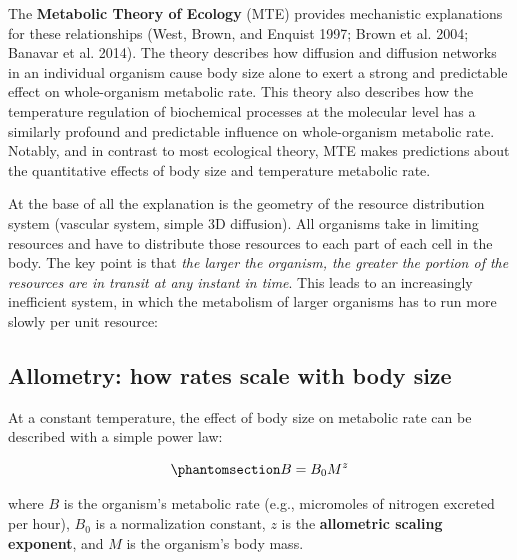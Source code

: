 \documentclass[
  letterpaper,
  DIV=11,
  numbers=noendperiod]{scrreprt}
\begin{document}
The \textbf{Metabolic Theory of Ecology} (MTE) provides mechanistic
explanations for these relationships (West, Brown, and Enquist 1997;
Brown et al. 2004; Banavar et al. 2014). The theory describes how
diffusion and diffusion networks in an individual organism cause body
size alone to exert a strong and predictable effect on whole-organism
metabolic rate. This theory also describes how the temperature
regulation of biochemical processes at the molecular level has a
similarly profound and predictable influence on whole-organism metabolic
rate. Notably, and in contrast to most ecological theory, MTE makes
predictions about the quantitative effects of body size and temperature
metabolic rate.

At the base of all the explanation is the geometry of the resource
distribution system (vascular system, simple 3D diffusion). All
organisms take in limiting resources and have to distribute those
resources to each part of each cell in the body. The key point is that
\emph{the larger the organism, the greater the portion of the resources
are in transit at any instant in time}. This leads to an increasingly
inefficient system, in which the metabolism of larger organisms has to
run more slowly per unit resource:

\subsection{Allometry: how rates scale with body
size}\label{allometry-how-rates-scale-with-body-size}

At a constant temperature, the effect of body size on metabolic rate can
be described with a simple power law:

\begin{equation}\phantomsection\label{eq-allometry}{B = B_0 M^z}\end{equation}

where \(B\) is the organism's metabolic rate (e.g., micromoles of
nitrogen excreted per hour), \(B_0\) is a normalization constant, \(z\)
is the \textbf{allometric scaling exponent}, and \(M\) is the organism's
body mass.
\end{document}

